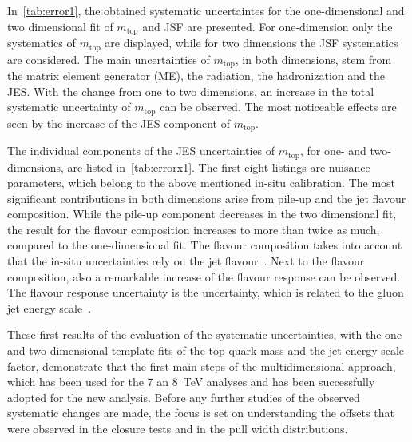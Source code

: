  In~\cref{tab:error1}, the obtained systematic uncertaintes for the one-dimensional and two dimensional fit of $m_{\text{top}}$ and JSF are presented.  For one-dimension only the systematics of $m_{\text{top}}$ are displayed, while for two dimensions the JSF systematics are considered. The main uncertainties of $m_{\text{top}}$, in both dimensions, stem from the matrix element generator (ME), the radiation, the hadronization and the JES.  With the change from one to two dimensions, an increase in the  total systematic uncertainty of $m_{\text{top}}$ can be observed. The most noticeable effects are seen by the increase of the JES component of $m_{\text{top}}$.

 The individual components of the JES uncertainties of $m_{\text{top}}$, for one- and two-dimensions, are listed in~\cref{tab:errorx1}. The first eight listings are nuisance parameters, which belong to the above mentioned in-situ calibration. The most significant contributions in both dimensions arise from pile-up and the jet flavour composition. While  the pile-up component decreases in the two dimensional fit, the result for the flavour composition increases to more than twice as much, compared to the one-dimensional fit.  The flavour composition takes into account  that the  in-situ uncertainties rely on the jet flavour~\cite{ATL-PHYS-PUB-2015-015}. Next to the flavour composition, also a remarkable increase of the flavour response can be observed. The flavour response uncertainty is the uncertainty, which is related to the gluon jet energy scale~\cite{ATL-PHYS-PUB-2015-015}.  

 These first results of the evaluation of the systematic uncertainties, with the one and two dimensional template fits of the top-quark mass and the jet energy scale factor, demonstrate  that the  first main steps of the multidimensional approach, which has been used for the 7 an 8~TeV analyses and has been successfully adopted for the new analysis.  Before any further studies of the observed systematic changes are made, the 
focus is set on understanding the offsets that were observed in the closure tests and in the pull width distributions.


